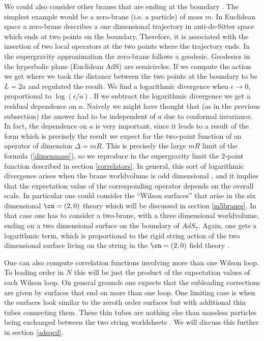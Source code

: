 We could also consider other branes that are ending at the boundary
\cite{Graham:1999pm}.  The simplest example would be a zero-brane
(i.e. a particle) of mass $m$. In Euclidean space a zero-brane
describes a one dimensional trajectory in anti-de-Sitter space which
ends at two points on the boundary.  Therefore, it is associated with
the insertion of two local operators at the two points where the
trajectory ends. In the supergravity approximation the zero-brane
follows a geodesic.  Geodesics in the hyperbolic plane (Euclidean AdS)
are semicircles. If we compute the action we get
where we took the distance between the two points at the boundary
 to be $L = 2a$
and  regulated the result. We find a logarithmic divergence when
$\epsilon \to 0$, proportional to $ \log(\epsilon/a) $. 
If we subtract the logarithmic divergence we get a residual dependence
on $a$. Naively we might have thought that (as in the previous 
subsection) the answer had
to be independent of $a$ due to conformal invariance. 
In fact, the dependence on $a$ is very important, since it leads to 
a result of the form
which is precisely the result we expect for the two-point function of an
operator of dimension $\Delta = m R$. This is precisely the 
large $mR$ limit of the formula (\ref{dimenmass}), so we reproduce in
the supergravity limit the 2-point function described in section 
\ref{correlators}. 
In general, this sort of logarithmic 
divergence arises when the brane worldvolume is 
odd dimensional \cite{Graham:1999pm},
 and it implies that the expectation
value of the corresponding operator depends on the overall scale. 
In particular one could consider the ``Wilson surfaces'' that 
arise in the six dimensional $\cn=(2,0)$ theory which will be discussed
in section \ref{m5branes}. In that 
case one has to consider a two-brane, with a three
dimensional worldvolume,  ending on a two dimensional
surface on the boundary of $AdS_7$. Again, one gets a logarithmic term,
which is proportional to the rigid string action of the two 
dimensional surface living on the string in the $\cn=(2,0)$ field theory 
\cite{Berenstein:1998ij,Graham:1999pm}.

One can also compute correlation functions involving more than one
Wilson loop. To leading order in $N$ this will be just the product of
the expectation values of each Wilson loop. On general grounds one
expects that the subleading corrections are given by surfaces that end
on more than one loop. One limiting case is when the surfaces look
similar to the zeroth order surfaces but with additional thin tubes
connecting them. These thin tubes are nothing else than massless
particles being exchanged between the two string worldsheets
\cite{Gross:1998gk,Berenstein:1998ij}. We will discuss this further in
section \ref{adsqcd}.







% 






